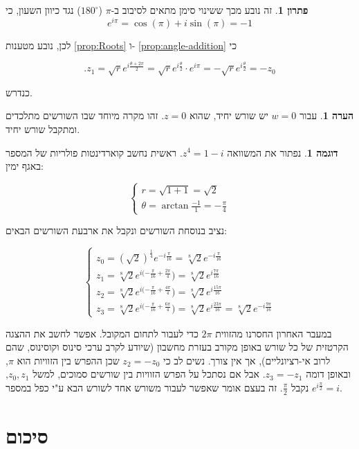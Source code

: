 \documentclass[12pt]{report}
\theoremstyle{plain}
\theoremstyle{definition}
\newtheorem{example}{דוגמה}[chapter]
\newtheorem{remark}{הערה}[chapter]
\newtheorem*{solution}{פתרון}
\newcommand{\0}{\mathbf{0}}
\begin{document}
\begin{solution}
זה נובע מכך ששינוי סימן מתאים לסיבוב ב-$\pi$
($180^{\circ}$) נגד כיוון השעון, כי 
$$
e^{i\pi}=\cos(\pi)+i\sin(\pi)=-1
$$

לכן, נובע מטענות
\ref{prop:Roots}
ו-
\ref{prop:angle-addition}
כי

$$
.z_1=\sqrt{r}e^{i\frac{\theta+2\pi}{2}}=\sqrt{r}e^{i\frac{\theta}{2}}\cdot e^{i\pi}=-\sqrt{r}e^{i\frac{\theta}{2}}=-z_0
$$

כנדרש.
\end{solution}

\begin{remark}
עבור $w=0$ יש שורש יחיד, שהוא $z=0$. זהו מקרה
מיוחד שבו השורשים מתלכדים ומתקבל שורש יחיד.
\end{remark}

\begin{example}
נפתור את המשוואה $z^{4}=1-i$. ראשית נחשב קוארדינטות
פולריות של המספר באגף ימין:

$$
\begin{cases}
r=\sqrt{1+1}=\sqrt{2}\\
\theta=\arctan\frac{-1}{1}=-\frac{\pi}{4}
\end{cases}
$$

נציב בנוסחת השורשים ונקבל את ארבעת השורשים הבאים:

$$
\begin{cases}
z_{0}=(\sqrt{2})^{\frac{1}{4}}e^{-i\frac{\pi}{16}}=\sqrt[8]{2}e^{-i\frac{\pi}{16}}\\
z_{1}=\sqrt[8]{2}e^{i(-\frac{\pi}{16}+\frac{2\pi}{4}})=\sqrt[8]{2}e^{i\frac{7\pi}{16}}\\
z_{2}=\sqrt[8]{2}e^{i(-\frac{\pi}{16}+\frac{4\pi}{4}})=\sqrt[8]{2}e^{i\frac{15\pi}{16}}\\
z_{3}=\sqrt[8]{2}e^{i(-\frac{\pi}{16}+\frac{6\pi}{4}})=\sqrt[8]{2}e^{i\frac{23\pi}{16}}=\sqrt[8]{2}e^{-i\frac{9\pi}{16}}
\end{cases}
$$

במעבר האחרון החסרנו מהזווית
$2\pi$
כדי לעבור לתחום המקובל. אפשר
לחשב את ההצגה הקרטזית של כל שורש באופן מקורב בעזרת מחשבון (שיודע לקרב
ערכי סינוס וקוסינוס, שהם לרוב אי-רציונליים), אך אין צורך. נשים לב
כי $z_{2}=-z_{0}$ שכן ההפרש בין הזוויות הוא $\pi$, ובאופן
דומה $z_{3}=-z_{1}$. אבל אם נסתכל על הפרש הזוויות בין שורשים
סמוכים, למשל $z_{0},z_{1}$, נקבל $\frac{\pi}{2}$. זה בעצם
אומר שאפשר לעבור משורש אחד לשורש הבא ע"י כפל במספר $e^{i\frac{\pi}{2}}=i$.
\end{example}

\clearpage
\section{סיכום}
\end{document}

